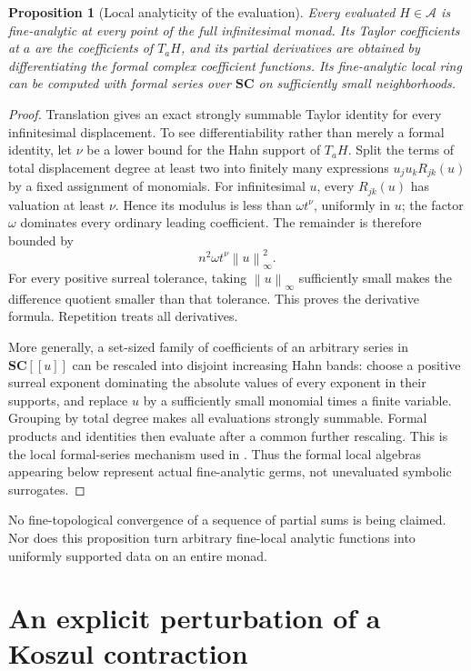 \documentclass[11pt,letterpaper]{article}
\newtheorem{proposition}[proposition]{Proposition}
\theoremstyle{definition}
\theoremstyle{remark}
\newcommand{\SC}{\mathbf{SC}}
\newcommand{\A}{\mathscr A}
\newcommand{\norm}[1]{\left\lVert#1\right\rVert}
\numberwithin{equation}{section}
\begin{document}
\begin{proposition}[Local analyticity of the evaluation]\label{prop:fine}
Every evaluated $H\in\A$ is fine-analytic at every point of the full infinitesimal monad. Its Taylor coefficients at $a$ are the coefficients of $T_aH$, and its partial derivatives are obtained by differentiating the formal complex coefficient functions. Its fine-analytic local ring can be computed with formal series over $\SC$ on sufficiently small neighborhoods.
\end{proposition}
\begin{proof}
Translation gives an exact strongly summable Taylor identity for every infinitesimal displacement. To see differentiability rather than merely a formal identity, let $\nu$ be a lower bound for the Hahn support of $T_aH$. Split the terms of total displacement degree at least two into finitely many expressions $u_j u_kR_{jk}(u)$ by a fixed assignment of monomials. For infinitesimal $u$, every $R_{jk}(u)$ has valuation at least $\nu$. Hence its modulus is less than $\omega t^\nu$, uniformly in $u$; the factor $\omega$ dominates every ordinary leading coefficient. The remainder is therefore bounded by
\[
 n^2\omega t^\nu\norm{u}_\infty^2.
\]
For every positive surreal tolerance, taking $\norm{u}_\infty$ sufficiently small makes the difference quotient smaller than that tolerance. This proves the derivative formula. Repetition treats all derivatives.

More generally, a set-sized family of coefficients of an arbitrary series in $\SC[[u]]$ can be rescaled into disjoint increasing Hahn bands: choose a positive surreal exponent dominating the absolute values of every exponent in their supports, and replace $u$ by a sufficiently small monomial times a finite variable. Grouping by total degree makes all evaluations strongly summable. Formal products and identities then evaluate after a common further rescaling. This is the local formal-series mechanism used in \cite{Alling,Prior}. Thus the formal local algebras appearing below represent actual fine-analytic germs, not unevaluated symbolic surrogates.
\end{proof}
No fine-topological convergence of a sequence of partial sums is being claimed. Nor does this proposition turn arbitrary fine-local analytic functions into uniformly supported data on an entire monad.

\section{An explicit perturbation of a Koszul contraction}\label{sec:contraction}
\end{document}
